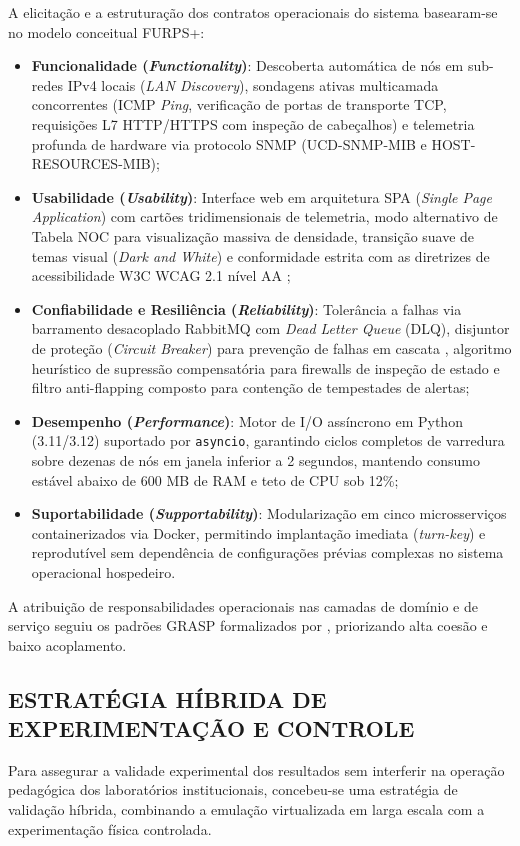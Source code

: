 \documentclass[12pt,a4paper]{article}
\begin{document}
A elicitação e a estruturação dos contratos operacionais do sistema basearam-se no modelo conceitual FURPS+:
\begin{itemize}[leftmargin=1.25cm]
\item \textbf{Funcionalidade (\textit{Functionality})}: Descoberta automática de nós em sub-redes IPv4 locais (\textit{LAN Discovery}), sondagens ativas multicamada concorrentes (ICMP \textit{Ping}, verificação de portas de transporte TCP, requisições L7 HTTP/HTTPS com inspeção de cabeçalhos) e telemetria profunda de hardware via protocolo SNMP (UCD-SNMP-MIB e HOST-RESOURCES-MIB);
\item \textbf{Usabilidade (\textit{Usability})}: Interface web em arquitetura SPA (\textit{Single Page Application}) com cartões tridimensionais de telemetria, modo alternativo de Tabela NOC para visualização massiva de densidade, transição suave de temas visual (\textit{Dark and White}) e conformidade estrita com as diretrizes de acessibilidade W3C WCAG 2.1 nível AA \cite{w3c2018wcag21};
\item \textbf{Confiabilidade e Resiliência (\textit{Reliability})}: Tolerância a falhas via barramento desacoplado RabbitMQ com \textit{Dead Letter Queue} (DLQ), disjuntor de proteção (\textit{Circuit Breaker}) para prevenção de falhas em cascata \cite{nygard2018release}, algoritmo heurístico de supressão compensatória para firewalls de inspeção de estado e filtro anti-flapping composto para contenção de tempestades de alertas;
\item \textbf{Desempenho (\textit{Performance})}: Motor de I/O assíncrono em Python (3.11/3.12) suportado por \texttt{asyncio}, garantindo ciclos completos de varredura sobre dezenas de nós em janela inferior a 2 segundos, mantendo consumo estável abaixo de 600 MB de RAM e teto de CPU sob 12\%;
\item \textbf{Suportabilidade (\textit{Supportability})}: Modularização em cinco microsserviços containerizados via Docker, permitindo implantação imediata (\textit{turn-key}) e reprodutível sem dependência de configurações prévias complexas no sistema operacional hospedeiro.
\end{itemize}

A atribuição de responsabilidades operacionais nas camadas de domínio e de serviço seguiu os padrões GRASP formalizados por , priorizando alta coesão e baixo acoplamento.

\subsection{ESTRATÉGIA HÍBRIDA DE EXPERIMENTAÇÃO E CONTROLE}
Para assegurar a validade experimental dos resultados sem interferir na operação pedagógica dos laboratórios institucionais, concebeu-se uma estratégia de validação híbrida, combinando a emulação virtualizada em larga escala com a experimentação física controlada.
\end{document}
